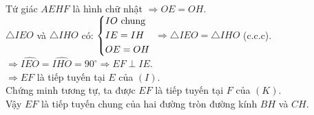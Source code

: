 \begin{ex}
{\begin{enumerate}
		Tứ giác $AEHF$ là hình chữ nhật $\Rightarrow OE = OH$.\\
		$\triangle IEO$ và $\triangle IHO$ có: $\left\{\begin{aligned}&IO\ \text{chung}\\ &IE = IH\\ &OE = OH\end{aligned}\right.$
		$\Rightarrow \triangle IEO = \triangle IHO$ (c.c.c).\\
		\noindent
		$\Rightarrow \widehat{IEO}=\widehat{IHO}=90^\circ \Rightarrow EF\perp IE $.\\
		\noindent
		$\Rightarrow EF$ là tiếp tuyến tại $E$ của $(I)$.\\
		Chứng minh tương tự, ta được $EF$ là tiếp tuyến tại $F$ của $(K)$.\\
		Vậy $EF$ là tiếp tuyến chung của hai đường tròn đường kính $BH$ và $CH$.
	  \end{enumerate} 
	}

\end{ex}

